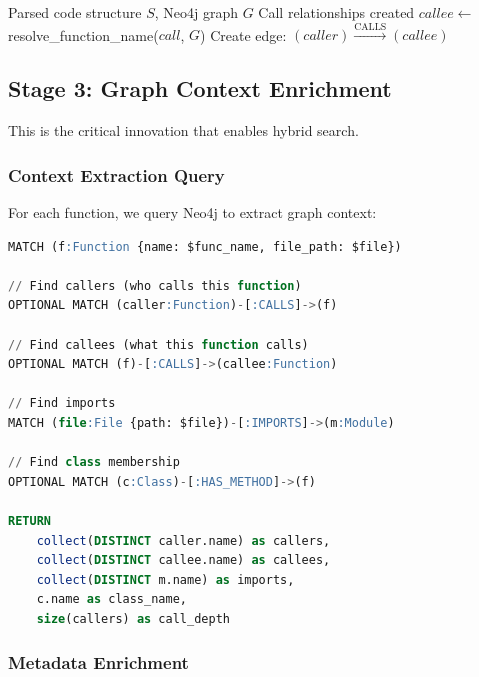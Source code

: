 \documentclass[11pt,letterpaper]{article}
\begin{document}
\begin{algorithm}
\caption{Create Call Relationships}
\begin{algorithmic}[1]
\REQUIRE Parsed code structure $S$, Neo4j graph $G$
\ENSURE Call relationships created
        \STATE $callee \gets$ resolve\_function\_name($call$, $G$)
            \STATE Create edge: $(caller) \xrightarrow{\text{CALLS}} (callee)$
        \ENDIF
    \ENDFOR
\ENDFOR
\end{algorithmic}
\end{algorithm}

\subsection{Stage 3: Graph Context Enrichment}

This is the critical innovation that enables hybrid search.

\subsubsection{Context Extraction Query}

For each function, we query Neo4j to extract graph context:

\begin{lstlisting}[language=SQL, caption=Neo4j context extraction query]
MATCH (f:Function {name: $func_name, file_path: $file})

// Find callers (who calls this function)
OPTIONAL MATCH (caller:Function)-[:CALLS]->(f)

// Find callees (what this function calls)
OPTIONAL MATCH (f)-[:CALLS]->(callee:Function)

// Find imports
MATCH (file:File {path: $file})-[:IMPORTS]->(m:Module)

// Find class membership
OPTIONAL MATCH (c:Class)-[:HAS_METHOD]->(f)

RETURN 
    collect(DISTINCT caller.name) as callers,
    collect(DISTINCT callee.name) as callees,
    collect(DISTINCT m.name) as imports,
    c.name as class_name,
    size(callers) as call_depth
\end{lstlisting}

\subsubsection{Metadata Enrichment}
\end{document}
